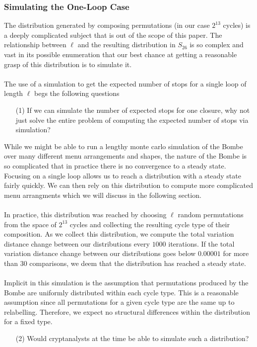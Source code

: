 \subsubsection{Simulating the One-Loop Case}
The distribution generated by composing permutations (in our case $2^{13}$ cycles) is a deeply complicated subject that is out of the scope of this paper. The relationship between $\ell$ and the resulting distribution in $S_{26}$ is so complex and vast in its possible enumeration that our best chance at getting a reasonable grasp of this distribution is to simulate it.
\\\\The use of a simulation to get the expected number of stops for a single loop of length $\ell$ begs the following questions
\begin{enumerate}
	\item[(1)] If we can simulate the number of expected stops for one closure, why not just solve the entire problem of computing the expected number of stops via simulation?
\end{enumerate}
While we might be able to run a lengthy monte carlo simulation of the Bombe over many different menu arrangements and shapes, the nature of the Bombe is so complicated that in practice there is no convergence to a steady state. Focusing on a single loop allows us to reach a distribution with a steady state fairly quickly. We can then rely on this distribution to compute more complicated menu arrangments which we will discuss in the following section.
\\\\In practice, this distribution was reached by choosing $\ell$ random permutations from the space of $2^{13}$ cycles and collecting the resulting cycle type of their composition. As we collect this distribution, we compute the total variation distance change between our distributions every $1000$ iterations. If the total variation distance change between our distributions goes below $0.00001$ for more than $30$ comparisons, we deem that the distribution has reached a steady state.
\\\\Implicit in this simulation is the assumption that permutations produced by the Bombe are uniformly distributed within each cycle type. This is a reasonable assumption since all permutations for a given cycle type are the same up to relabelling. Therefore, we expect no structural differences within the distribution for a fixed type.
\begin{enumerate}
	\item[(2)]Would cryptanalysts at the time be able to simulate such a distribution?
\end{enumerate}
